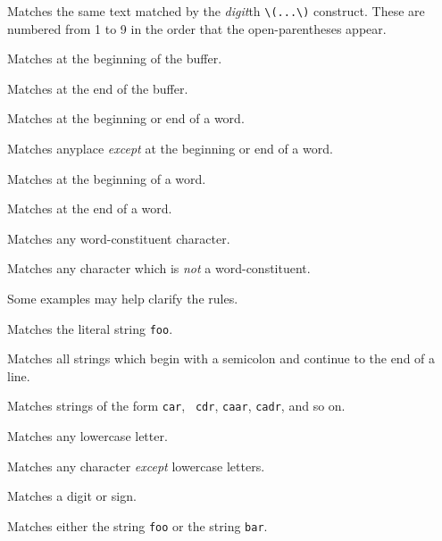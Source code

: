 \begin{define}{\hspace{1in}}
\item[{\tt $\backslash${\em digit\/}}\hfill] Matches the same text
matched by the {\em digit\/}th \verb"\(...\)" construct.  These are
numbered from 1 to 9 in the order that the open-parentheses appear. 

\item[{\tt $\backslash$`}\hfill] Matches at the beginning of the buffer. 

\item[{\tt $\backslash$'}\hfill] Matches at the end of the buffer. 

\item[{\tt $\backslash$b}\hfill] Matches at the beginning or end of a word. 

\item[{\tt $\backslash$B}\hfill] Matches anyplace {\em except\/} at
the beginning or end of a word. 

\item[{\tt $\backslash$<}\hfill] Matches at the beginning of a word. 

\item[{\tt $\backslash$>}\hfill] Matches at the end of a word. 

\item[{\tt $\backslash$w}\hfill] Matches any word-constituent character. 

\item[{\tt $\backslash$W}\hfill] Matches any character which is {\em
not\/} a word-constituent. 

\end{define}

Some examples may help clarify the rules.

\begin{define}{\hspace{1in}}

\item[{\tt foo}\hfill] Matches the literal string {\tt foo}. 

\item[{\tt ;.*}\hfill] Matches all strings which begin with a
semicolon and continue to the end of a line. 

\item[{\tt c[ad]+r}\hfill] Matches strings of the form {\tt car}, {\tt
cdr}, {\tt caar}, {\tt cadr}, and so on. 

\item[{\tt [a-z]}\hfill] Matches any lowercase letter. 

\item[{\tt [\^{ }a-z]}\hfill] Matches any character {\em except\/}
lowercase letters. 

\item[{\tt [0-9+---]}\hfill] Matches a digit or sign. 

\item[{\tt $\backslash$(foo$\backslash$|bar$\backslash$)}\hfill]
Matches either the string {\tt foo} or the string {\tt bar}. 

\end{define}


